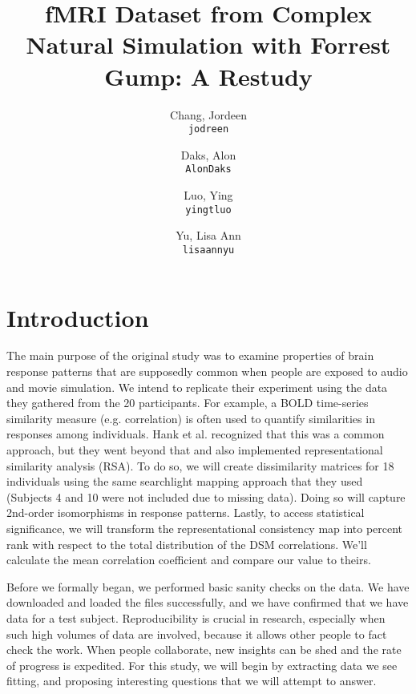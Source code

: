 \documentclass[11pt]{article}
\title{fMRI Dataset from Complex Natural Simulation with Forrest Gump: A Restudy}
\author{
  Chang, Jordeen\\
  \texttt{jodreen}
  \and
  Daks, Alon\\
  \texttt{AlonDaks}
  \and
  Luo, Ying\\
  \texttt{yingtluo}
  \and
  Yu, Lisa Ann\\
  \texttt{lisaannyu}
}
\begin{document}
\maketitle


\section{Introduction}

The main purpose of the original study was to examine properties of brain
response patterns that are supposedly common when people are exposed to audio
and movie simulation. We intend to replicate their experiment using the data
they gathered from the 20 participants. For example, a BOLD time-series
similarity measure (e.g. correlation) is often used to quantify similarities
in responses among individuals. Hank et al. recognized that this was a common
approach, but they went beyond that and also implemented representational
similarity analysis (RSA). To do so, we will create dissimilarity matrices for
18 individuals using the same searchlight mapping approach that they used
(Subjects 4 and 10 were not included due to missing data). Doing so will
capture 2nd-order isomorphisms in response patterns. Lastly, to access
statistical significance, we will transform the representational consistency
map into percent rank with respect to the total distribution of the DSM
correlations. We'll calculate the mean correlation coefficient and compare our
value to theirs.

Before we formally began, we performed basic sanity checks on the data. We
have downloaded and loaded the files successfully, and we have confirmed that
we have data for a test subject. Reproducibility is crucial in research,
especially when such high volumes of data are involved, because it allows
other people to fact check the work. When people collaborate, new insights can
be shed and the rate of progress is expedited. For this study, we will begin
by extracting data we see fitting, and proposing interesting questions that we
will attempt to answer.
\end{document}
